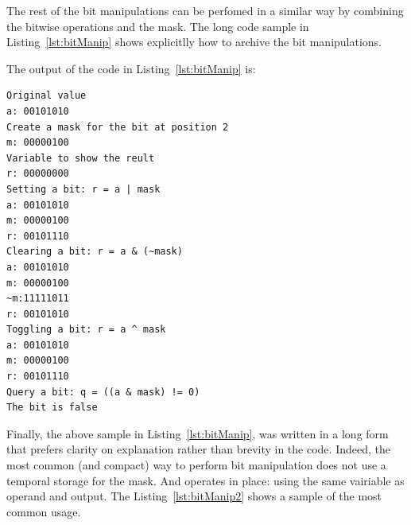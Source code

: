 The rest of the bit manipulations can be perfomed in a similar way by combining the bitwise operations and the mask.
The long code sample in Listing~\ref{lst:bitManip} shows explicitlly how to archive the bit manipulations.

{\centering
\begin{minipage}{\linewidth}
\end{minipage}
\par
}

The output of the code in Listing~\ref{lst:bitManip} is:
\begin{verbatim}
Original value
a: 00101010
Create a mask for the bit at position 2
m: 00000100
Variable to show the reult
r: 00000000
Setting a bit: r = a | mask
a: 00101010
m: 00000100
r: 00101110
Clearing a bit: r = a & (~mask)
a: 00101010
m: 00000100
~m:11111011
r: 00101010
Toggling a bit: r = a ^ mask
a: 00101010
m: 00000100
r: 00101110
Query a bit: q = ((a & mask) != 0)
The bit is false
\end{verbatim}

Finally, the above sample in Listing~\ref{lst:bitManip}, was written in a long form that prefers clarity on explanation rather than brevity in the code.
Indeed, the most common (and compact) way to perform bit manipulation does not use a temporal storage for the mask.
And operates in place: using the same vairiable as operand and output.
The Listing~\ref{lst:bitManip2} shows a sample of the most common usage.

{\centering
\begin{minipage}{\linewidth}
\end{minipage}
\par
}

